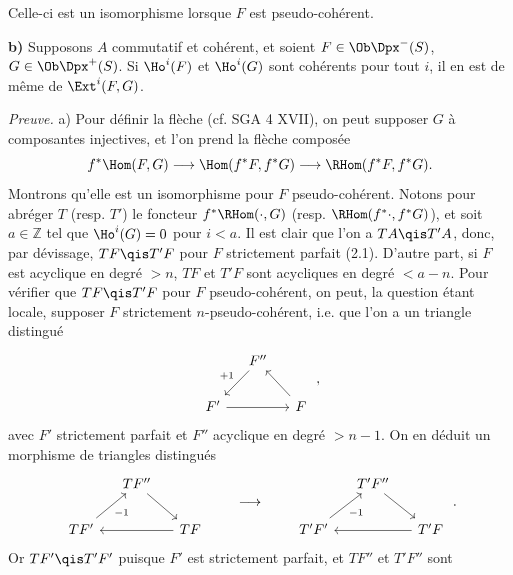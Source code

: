 Celle-ci est un isomorphisme lorsque \(F\) est pseudo-cohérent.

\textbf{b)} Supposons \(A\) commutatif et cohérent, et soient \(F\in\Ob\Dpx^-(S)\), \(G\in\Ob\Dpx^+(S)\). Si \(\Ho^i(F)\) et \(\Ho^i(G)\) sont cohérents pour tout \(i\), il en est de même de \(\Ext^i(F,G)\).

\emph{Preuve.} a) Pour définir la flèche (cf. SGA 4 XVII), on peut supposer \(G\) à composantes injectives, et l'on prend la flèche composée
\[
  f^*\Hom(F,G)\longrightarrow\Hom(f^*F,f^*G)\longrightarrow\RHom(f^*F,f^*G).
\]
Montrons qu'elle est un isomorphisme pour \(F\) pseudo-cohérent. Notons pour abréger \(T\) (resp. \(T'\)) le foncteur \(f^*\RHom(\cdot,G)\) (resp. \(\RHom(f^*\cdot,f^*G)\)), et soit \(a\in\mathbb Z\) tel que \(\Ho^i(G)=0\) pour \(i<a\). Il est clair que l'on a \(TA\qis T'A\), donc, par dévissage, \(TF\qis T'F\) pour \(F\) strictement parfait (2.1). D'autre part, si \(F\) est acyclique en degré \(>n\), \(TF\) et \(T'F\) sont acycliques en degré \(<a-n\). Pour vérifier que \(TF\qis T'F\) pour \(F\) pseudo-cohérent, on peut, la question étant locale, supposer \(F\) strictement \(n\)-pseudo-cohérent, i.e. que l'on a un triangle distingué
\[
\begin{tikzcd}[column sep=small]
& F'' \arrow[dl,"+1"'] & \\
F' \arrow[rr] & & F \arrow[ul]
\end{tikzcd}
\;,
\]
avec \(F'\) strictement parfait et \(F''\) acyclique en degré \(>n-1\). On en déduit un morphisme de triangles distingués
\[
\begin{tikzcd}[column sep=small]
& TF'' \arrow[dr] & \\
TF' \arrow[ur,"-1"'] & & TF \arrow[ll]
\end{tikzcd}
\qquad\longrightarrow\qquad
\begin{tikzcd}[column sep=small]
& T'F'' \arrow[dr] & \\
T'F' \arrow[ur,"-1"'] & & T'F \arrow[ll]
\end{tikzcd}
\;.
\]
Or \(TF'\qis T'F'\) puisque \(F'\) est strictement parfait, et \(TF''\) et \(T'F''\) sont
